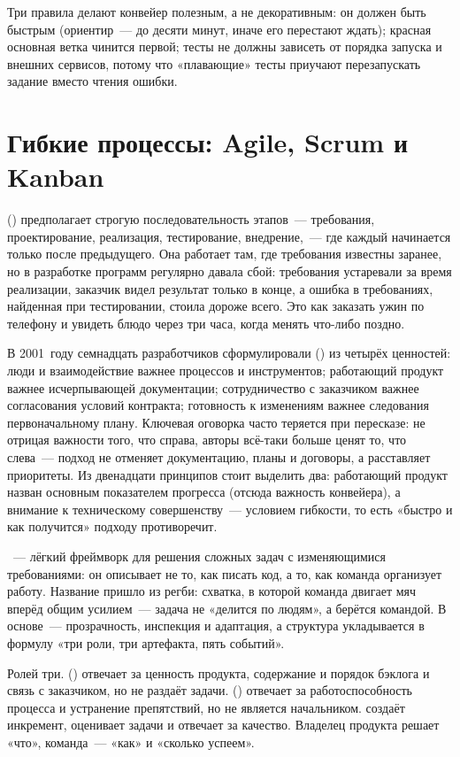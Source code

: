 Три правила делают конвейер полезным, а не декоративным: он должен быть быстрым (ориентир~--- до десяти минут, иначе его перестают ждать); красная основная ветка чинится первой; тесты не должны зависеть от порядка запуска и внешних сервисов, потому что «плавающие» тесты приучают перезапускать задание вместо чтения ошибки.

\section{Гибкие процессы: Agile, Scrum и Kanban}

 () предполагает строгую последовательность этапов~--- требования, проектирование, реализация, тестирование, внедрение,~--- где каждый начинается только после предыдущего. Она работает там, где требования известны заранее, но в разработке программ регулярно давала сбой: требования устаревали за время реализации, заказчик видел результат только в конце, а ошибка в требованиях, найденная при тестировании, стоила дороже всего. Это как заказать ужин по телефону и увидеть блюдо через три часа, когда менять что-либо поздно.

В 2001~году семнадцать разработчиков сформулировали  () из четырёх ценностей: люди и взаимодействие важнее процессов и инструментов; работающий продукт важнее исчерпывающей документации; сотрудничество с заказчиком важнее согласования условий контракта; готовность к изменениям важнее следования первоначальному плану. Ключевая оговорка часто теряется при пересказе: не отрицая важности того, что справа, авторы всё-таки больше ценят то, что слева~--- подход не отменяет документацию, планы и договоры, а расставляет приоритеты. Из двенадцати принципов стоит выделить два: работающий продукт назван основным показателем прогресса (отсюда важность конвейера), а внимание к техническому совершенству~--- условием гибкости, то есть «быстро и как получится» подходу противоречит.

~--- лёгкий фреймворк для решения сложных задач с изменяющимися требованиями: он описывает не то, как писать код, а то, как команда организует работу. Название пришло из регби: схватка, в которой команда двигает мяч вперёд общим усилием~--- задача не «делится по людям», а берётся командой. В основе~--- прозрачность, инспекция и адаптация, а структура укладывается в формулу «три роли, три артефакта, пять событий».

Ролей три.  () отвечает за ценность продукта, содержание и порядок бэклога и связь с заказчиком, но не раздаёт задачи.  () отвечает за работоспособность процесса и устранение препятствий, но не является начальником.  создаёт инкремент, оценивает задачи и отвечает за качество. Владелец продукта решает «что», команда~--- «как» и «сколько успеем».

